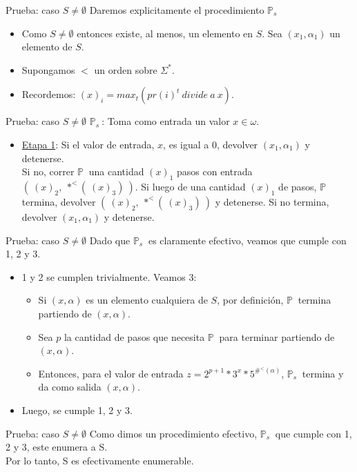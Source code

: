 \documentclass[10pt]{beamer}
\newcommand{\p}{\mathbb{P}}
\begin{document}
\begin{frame}{Prueba: caso $S \neq \emptyset$}
  Daremos explicitamente el procedimiento $\p_{s}\ $
  \begin{itemize}[<+->]
    \item Como $S \neq \emptyset$ entonces existe, al menos, un elemento en $S$.
    Sea $(x_{1}, \alpha_{1})$ un elemento de $S$.
    \item Supongamos $<$ un orden sobre $\Sigma^{*}$.
    \item Recordemos: $(x)_{i} = max_{t}(pr(i)^{t}\ divide\ a\ x)$.
  \end{itemize}

\end{frame}



\begin{frame}{Prueba: caso $S \neq \emptyset$}
  \underline{$\p_{s}\ $}: Toma como entrada un valor $x \in \omega$.
  \begin{itemize}[<+->]
    \item[ ] \underline{Etapa 1}: Si el valor de entrada, $x$, es igual a $0$,
    devolver $(x_{1}, \alpha_{1})$ y detenerse. \\
    Si no, correr $\p\ $ una cantidad $(x)_{1}$ pasos con entrada
    $(\ (x)_{2},\ *^{<}(\ (x)_{3})\ )$. Si luego de una cantidad $(x)_{1}$
    de pasos, $\p\ $ termina, devolver $(\ (x)_{2},\ *^{<}(\ (x)_{3})\ )$ y
    detenerse. Si no termina, devolver $(x_{1}, \alpha_{1})$ y detenerse.

  \end{itemize}
\end{frame}

\begin{frame}{Prueba: caso $S \neq \emptyset$}
  Dado que $\p_{s}\ $ es claramente efectivo, veamos que cumple con 1, 2 y 3.
  \begin{itemize}[<+->]
    \item 1 y 2 se cumplen trivialmente. Veamos 3:
    \begin{itemize}[<+->]
      \item Si $(x, \alpha)$ es un elemento cualquiera de $S$, por definición,
      $\p\ $ termina partiendo de $(x, \alpha)$.
      \item Sea $p$ la cantidad de pasos que necesita $\p\ $ para terminar partiendo
      de $(x, \alpha)$.
      \item Entonces, para el valor de entrada
      $z = 2^{p+1} * 3^{x} * 5^{\#^{<}(\alpha)}$, $\p_{s}\ $ termina y da como salida
      $(x, \alpha)$.
    \end{itemize}
    \item Luego, se cumple 1, 2 y 3.
  \end{itemize}

\end{frame}


\begin{frame}{Prueba: caso $S \neq \emptyset$}
  Como dimos un procedimiento efectivo, $\p_{s}\ $ que cumple con 1, 2 y 3, este
  enumera a S. \\
  Por lo tanto, S es efectivamente enumerable.
\end{frame}
\end{document}
